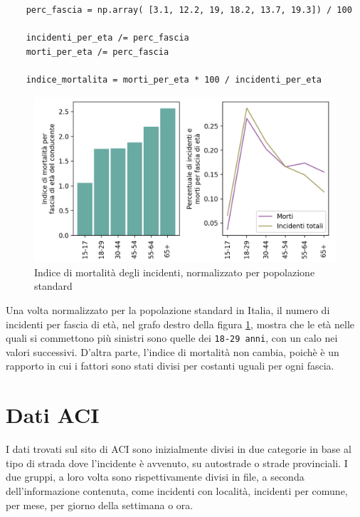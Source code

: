 \documentclass[a4paper,12pt]{report}
\newcommand{\columnstyle}[1]{\texttt{#1}}
\begin{document}
\begin{lstlisting}
    perc_fascia = np.array( [3.1, 12.2, 19, 18.2, 13.7, 19.3]) / 100

    incidenti_per_eta /= perc_fascia
    morti_per_eta /= perc_fascia

    indice_mortalita = morti_per_eta * 100 / incidenti_per_eta
\end{lstlisting}

\begin{figure}
    \includegraphics[width=\linewidth]{../src/incidenti/incidenti_senza_coords/mortalita/indice_mort_norm.png}
    \caption{Indice di mortalità degli incidenti, normalizzato per popolazione standard}
    \label{fig:indice-mort-norm}
\end{figure}

Una volta normalizzato per la popolazione standard in Italia, il numero di incidenti per 
fascia di età, nel grafo destro della figura \ref{fig:indice-mort-norm}, mostra che le 
età nelle quali si commettono più sinistri sono quelle dei \columnstyle{18-29 anni}, 
con un calo nei valori successivi.
D'altra parte, l'indice di mortalità non cambia, poichè è un rapporto in cui i fattori 
sono stati divisi per costanti uguali per ogni fascia.

\section{Dati ACI}

I dati trovati sul sito di ACI sono inizialmente divisi in due categorie in 
base al tipo di strada dove l'incidente è avvenuto, 
su autostrade o strade provinciali.
I due gruppi, a loro volta sono rispettivamente divisi in file, a seconda 
dell'informazione contenuta, come incidenti con località, incidenti per 
comune, per mese, per giorno della settimana o ora.
\end{document}
